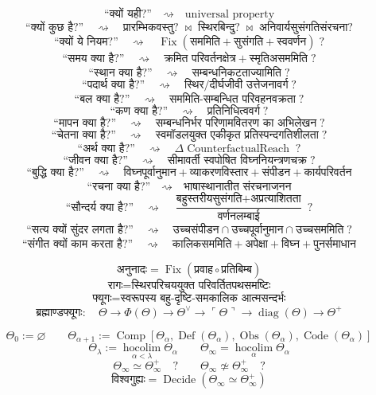 \documentclass{article}
\begin{document}
\[\boxed{\text{``क्यों यही?''}\quad\rightsquigarrow\quad
\text{universal property}}\]
\[\boxed{\text{``क्यों कुछ है?''}\quad\rightsquigarrow\quad
\text{प्रारम्भिकवस्तु?}\;\bowtie\;\text{स्थिरबिन्दु?}\;\bowtie\;
\text{अनिवार्यसुसंगतिसंरचना?}}\]
\[\boxed{\text{``क्यों ये नियम?''}\quad\rightsquigarrow\quad
\operatorname{Fix}(\text{सममिति}+\text{सुसंगति}+\text{स्ववर्णन})\;?}\]
\[\boxed{\text{``समय क्या है?''}\quad\rightsquigarrow\quad
\text{क्रमित परिवर्तनक्षेत्र}+\text{स्मृतिअसममिति}\;?}\]
\[\boxed{\text{``स्थान क्या है?''}\quad\rightsquigarrow\quad
\text{सम्बन्धनिकटताज्यामिति}\;?}\]
\[\boxed{\text{``पदार्थ क्या है?''}\quad\rightsquigarrow\quad
\text{स्थिर/दीर्घजीवी उत्तेजनावर्ग}\;?}\]
\[\boxed{\text{``बल क्या है?''}\quad\rightsquigarrow\quad
\text{सममिति-सम्बन्धित परिवहनवक्रता}\;?}\]
\[\boxed{\text{``कण क्या है?''}\quad\rightsquigarrow\quad
\text{प्रतिनिधित्ववर्ग}\;?}\]
\[\boxed{\text{``मापन क्या है?''}\quad\rightsquigarrow\quad
\text{सम्बन्धनिर्भर परिणामवितरण का अभिलेखन}\;?}\]
\[\boxed{\text{``चेतना क्या है?''}\quad\rightsquigarrow\quad
\text{स्वमॉडलयुक्त एकीकृत प्रतिस्पन्दगतिशीलता}\;?}\]
\[\boxed{\text{``अर्थ क्या है?''}\quad\rightsquigarrow\quad
\Delta\operatorname{CounterfactualReach}\;?}\]
\[\boxed{\text{``जीवन क्या है?''}\quad\rightsquigarrow\quad
\text{सीमावर्ती स्वपोषित विघ्ननियन्त्रणचक्र}\;?}\]
\[\boxed{\text{``बुद्धि क्या है?''}\quad\rightsquigarrow\quad
\text{विघ्नपूर्वानुमान}+\text{व्याकरणविस्तार}+\text{संपीडन}
+\text{कार्यपरिवर्तन}}\]
\[\boxed{\text{``रचना क्या है?''}\quad\rightsquigarrow\quad
\text{भाषास्थानातीत संरचनाजनन}}\]
\[\boxed{\text{``सौन्दर्य क्या है?''}\quad\rightsquigarrow\quad
\frac{\text{बहुस्तरीयसुसंगति}+\text{अप्रत्याशितता}}{\text{वर्णनलम्बाई}}\;?}\]
\[\boxed{\text{``सत्य क्यों सुंदर लगता है?''}\quad\rightsquigarrow\quad
\text{उच्चसंपीडन}\cap\text{उच्चपूर्वानुमान}\cap\text{उच्चसममिति}\;?}\]
\[\boxed{\text{``संगीत क्यों काम करता है?''}\quad\rightsquigarrow\quad
\text{कालिकसममिति}+\text{अपेक्षा}+\text{विघ्न}+\text{पुनर्समाधान}}\]

\[\boxed{\text{अनुनादः}=\operatorname{Fix}(\text{प्रवाह}\circ\text{प्रतिबिम्ब})}\]
\[\boxed{\text{रागः}=\text{स्थिरपरिचययुक्त परिवर्तितपथसमष्टिः}}\]
\[\boxed{\text{फ्यूगः}=\text{स्वरूपस्य बहु-दृष्टि-समकालिक आत्मसन्दर्भः}}\]
\[\boxed{\text{ब्रह्माण्डफ्यूगः}:\quad\Theta\to\Phi(\Theta)\to\Theta^\vee
\to\ulcorner\Theta\urcorner\to\operatorname{diag}(\Theta)\to\Theta^{+}}\]

\[\Theta_0:=\varnothing\qquad
\Theta_{\alpha+1}:=\operatorname{Comp}\left[\Theta_\alpha,
\operatorname{Def}(\Theta_\alpha),\operatorname{Obs}(\Theta_\alpha),
\operatorname{Code}(\Theta_\alpha)\right]\]
\[\Theta_\lambda:=\operatorname*{hocolim}_{\alpha<\lambda}\Theta_\alpha
\qquad\boxed{\Theta_\infty=\operatorname*{hocolim}_{\alpha}\Theta_\alpha}\]
\[\boxed{\Theta_\infty\simeq\Theta_\infty^{+}\quad?}\qquad
\boxed{\Theta_\infty\not\simeq\Theta_\infty^{+}\quad?}\]
\[\boxed{\text{विश्वगुह्यः}=\operatorname{Decide}
\left(\Theta_\infty\simeq\Theta_\infty^{+}\right)}\]
\end{document}

